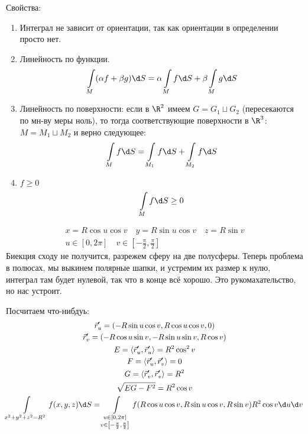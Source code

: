 Свойства:
\begin{enumerate}
\item
	Интеграл не зависит от ориентации, так как ориентации в определении просто нет.

\item
	Линейность по функции.
	\[ \int\limits_M (\alpha f + \beta g) \d S = \alpha \int\limits_M f \d S + \beta \int\limits_M g \d S \]

\item
	Линейность по поверхности: если в $\R^2$ имеем $G = G_1 \sqcup G_2$ (пересекаются по мн-ву меры ноль),
	то тогда соответствующие поверхности в $\R^3$: $M = M_1 \sqcup M_2$ и верно следующее:
	\[ \int\limits_M f \d S = \int\limits_{M_1} f \d S + \int\limits_{M_2} f \d S \]

\item
	$f \ge 0$
	\[ \int\limits_M f \d S \ge 0 \]
\end{enumerate}

\begin{exmp}
	\begin{gather*}
		x = R \cos u \cos v \quad y = R \sin u \cos v \quad z = R \sin v \\
		u \in [0, 2\pi] \quad v \in \left[-\frac\pi2,\frac\pi2\right]
	\end{gather*}
	Биекция сходу не получится, разрежем сферу на две полусферы.
	Теперь проблема в полюсах, мы выкинем полярные шапки, и устремим их размер к нулю, интеграл там будет нулевой, так что в конце всё хорошо.
	Это рукомахательство, но нас устроит.

	Посчитаем что-нибдуь:
	\begin{gather*}
		\vec r_u' = (-R \sin u \cos v, R \cos u \cos v, 0) \\
		\vec r_v' = (-R \cos u \sin v, -R \sin u \sin v, R \cos v) \\
		E = \left<\vec r_u', \vec r_u'\right> = R^2 \cos^2 v \\
		F = \left<\vec r_u', \vec r_v'\right> = 0 \\
		G = \left<\vec r_v', \vec r_v'\right> = R^2 \\
		\sqrt{EG-F^2} = R^2 \cos v \\
		\int\limits_{x^2+y^2+z^2=R^2} f(x, y, z) \d S
		= \int\limits_{\substack{u \in [0, 2\pi] \\ v \in \left[-\frac\pi2,\frac\pi2\right]}} f(R \cos u \cos v, R \sin u \cos v, R \sin v) R^2 \cos v \d u \d v
	\end{gather*}
\end{exmp}

